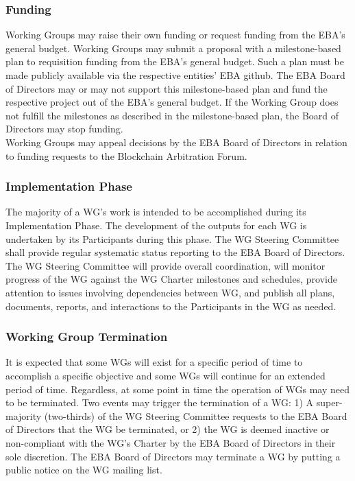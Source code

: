 \documentclass{article}
\begin{document}
\subsubsection{Funding}

Working Groups may raise their own funding or request funding from the EBA's general budget. Working Groups may submit a proposal with a milestone-based plan to requisition funding from the EBA's general budget. 
Such a plan must be made publicly available via the respective entities' EBA github. 
The EBA Board of Directors may or may not support this milestone-based plan and fund the respective project out of the EBA's general budget. 
If the Working Group does not fulfill the milestones as described in the milestone-based plan, the Board of Directors may stop funding. \\
Working Groups may appeal decisions by the EBA Board of Directors in relation to funding requests to the Blockchain Arbitration Forum.

\subsubsection{Implementation Phase}

The majority of a WG's work is intended to be accomplished during its Implementation Phase. 
The development of the outputs for each WG is undertaken by its Participants during this phase. 
The WG Steering Committee shall provide regular systematic status reporting to the EBA Board of Directors. 
The WG Steering Committee will provide overall coordination, will monitor progress of the WG against the WG Charter milestones and schedules, provide attention to issues involving dependencies between WG, and publish all plans, documents, reports, and interactions to the Participants in the WG as needed.

\subsubsection{Working Group Termination}

It is expected that some WGs will exist for a specific period of time to accomplish a specific objective and some WGs will continue for an extended period of time. 
Regardless, at some point in time the operation of WGs may need to be terminated. 
Two events may trigger the termination of a WG: 1) A super-majority (two-thirds) of the WG Steering Committee requests to the EBA Board of Directors that the WG be terminated, or 2) the WG is deemed inactive or non-compliant with the WG's Charter by the EBA Board of Directors in their sole discretion. 
The EBA Board of Directors may terminate a WG by putting a public notice on the WG mailing list.
\end{document}
